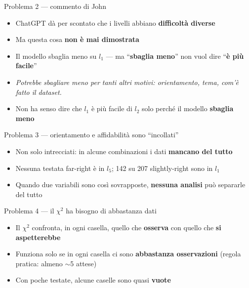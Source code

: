 \documentclass[aspectratio=169]{beamer}
\newcommand{\hl}[1]{\textbf{#1}}
\begin{document}
\begin{frame}{Problema 2 --- commento di John}
  \vfill
  \begin{itemize}[<+->]
    \setlength\itemsep{0.9em}
    \item ChatGPT d\`a per scontato che i livelli abbiano \hl{difficolt\`a diverse}
    \item Ma questa cosa \hl{non \`e mai dimostrata}
    \item Il modello sbaglia meno su $l_1$ --- ma ``\hl{sbaglia meno}'' non vuol dire ``\hl{\`e pi\`u facile}''
    \item[] {\small\itshape Potrebbe sbagliare meno per tanti altri motivi: orientamento, tema, com'\`e fatto il dataset.}
    \item Non ha senso dire che $l_1$ \`e pi\`u facile di $l_2$ solo perch\'e il modello \hl{sbaglia meno}
  \end{itemize}
  \vfill
\end{frame}

\begin{frame}{Problema 3 --- orientamento e affidabilit\`a sono ``incollati''}
  \vfill
  \begin{itemize}[<+->]
    \setlength\itemsep{0.8em}
    \item Non solo intrecciati: in alcune combinazioni i dati \hl{mancano del tutto}
    \item Nessuna testata far-right \`e in $l_5$; 142 su 207 slightly-right sono in $l_1$
    \item Quando due variabili sono cos\`i sovrapposte, \hl{nessuna analisi} pu\`o separarle del tutto
  \end{itemize}
  \vfill
\end{frame}


\begin{frame}{Problema 4 --- il $\chi^2$ ha bisogno di abbastanza dati}
  \vfill
  \begin{itemize}[<+->]
    \setlength\itemsep{0.9em}
    \item Il $\chi^2$ confronta, in ogni casella, quello che \hl{osserva} con quello che \hl{si aspetterebbe}
    \item Funziona solo se in ogni casella ci sono \hl{abbastanza osservazioni} (regola pratica: almeno $\sim$5 attese)
    \item Con poche testate, alcune caselle sono quasi \hl{vuote}
  \end{itemize}
  \vfill
\end{frame}
\end{document}
